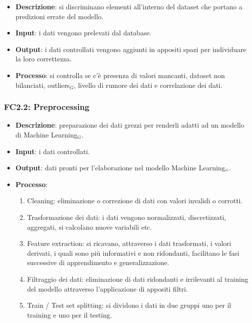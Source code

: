 \begin{itemize}
	\item \textbf{Descrizione}: si discriminano elementi all'interno del dataset che portano a predizioni errate del modello.
	\item \textbf{Input}: i dati vengono prelevati dal database.
	\item \textbf{Output}: i dati controllati vengono aggiunti in appositi spazi per individuare la loro correttezza.
	\item \textbf{Processo}: si controlla se c'è presenza di valori mancanti, dataset non bilanciati, outliers$_G$, livello di rumore dei dati e correlazione dei dati. 
\end{itemize}

\subsubsection{FC2.2: Preprocessing}\label{fasiProgettoElaborazioneDatiPreprocessing}

\begin{itemize}
	\item \textbf{Descrizione}: preparazione dei dati grezzi per renderli adatti ad un modello di Machine Learning$_G$. 
	\item \textbf{Input}: i dati controllati.
	\item \textbf{Output}: dati pronti per l'elaborazione nel modello Machine Learning$_{\scaleto{G}{3pt}}$.
	\item \textbf{Processo}: \begin{enumerate}[leftmargin = 2cm]
		\item Cleaning: eliminazione o correzione di dati con valori invalidi o corrotti.
		\item Trasformazione dei dati: i dati vengono normalizzati, discretizzati, aggregati, si calcolano nuove variabili etc.
		\item Feature extraction: si ricavano, attraverso i dati trasformati, i valori derivati, i quali sono più informativi e non ridondanti, facilitano le fasi successive di apprendimento e generalizzazione.
		\item Filtraggio dei dati: eliminazione di dati ridondanti e irrilevanti al training del modello attraverso l'applicazione di appositi filtri.
		\item Train / Test set splitting: si dividono i dati in due gruppi uno per il training e uno per il testing.
	\end{enumerate}

\end{itemize}

